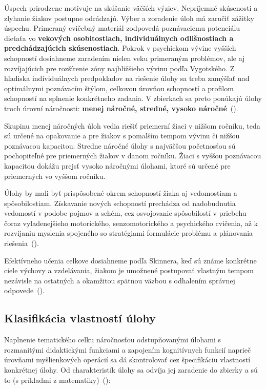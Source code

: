 Úspech prirodzene motivuje na skúšanie väčších výziev. Nepríjemné skúsenosti a zlyhanie žiakov postupne odrádzajú. Výber a zoradenie úloh má zaručiť zážitky úspechu. Primeraný cvičebný materiál zodpovedá poznávaciemu potenciálu dieťaťa vo \textbf{vekových osobitostiach, individuálnych odlišnostiach a predchádzajúcich skúsenostiach}. Pokrok v psychickom vývine vyšších schopností dosiahneme zaradením nielen veku primeraným problémov, ale aj rozvíjajúcich pre rozšírenie zóny najbližšieho vývinu podľa Vygotského. Z hľadiska individuálnych predpokladov na riešenie úlohy sa treba zamýšľať nad optimálnymi poznávacím štýlom, celkovou úrovňou schopností a profilom schopností na splnenie konkrétneho zadania. V zbierkach sa preto ponúkajú úlohy troch úrovní náročnosti: \textbf{menej náročné, stredné, vysoko náročné}~(\cite{pavlovkin_ziak_1989}).
 
Skupinu menej náročných úloh vedia riešiť priemerní žiaci v nižšom ročníku, teda sú určené na opakovanie a pre žiakov s pomalším tempom vývinu či nižšou poznávacou kapacitou. Stredne náročné úlohy s najväčšou početnosťou sú pochopiteľné pre priemerných žiakov v danom ročníku. Žiaci s vyššou poznávacou kapacitou dokážu prejsť vysoko náročnými úlohami, ktoré sú určené pre priemerných vo vyššom ročníku.
 
Úlohy by mali byť prispôsobené okrem schopností žiaka aj vedomostiam a spôsobilostiam. Získavanie nových schopností prechádza od nadobudnutia vedomostí v podobe pojmov a schém, cez osvojovanie spôsobilostí v priebehu čoraz vyladenejšieho motorického, senzomotorického a psychického cvičenia, až k rozvíjaniu myslenia spojeného so stratégiami formulácie problému a plánovania riešenia~(\cite{pavlovkin_ziak_1989}).

Efektívneho učenia celkove dosiahneme podľa Skinnera, keď sú známe konkrétne ciele výchovy a vzdelávania, žiakom je umožnené postupovať vlastným tempom nezávisle na ostatných a okamžitou spätnou väzbou s odhalením správnej odpovede~(\cite{pavlovkin_ziak_1989}).


\subsection{Klasifikácia vlastností úlohy} \label{sec:klasifikacia-ulohy}
Naplnenie tematického celku náročnosťou odstupňovanými úlohami s rozmanitými didaktickými funkciami a zapojením kognitívnych funkcií naprieč úrovňami myšlienkových operácií sa dá skontrolovať cez špecifikáciu vlastností konkrétnej úlohy. Od charakteristík úlohy sa odvíja  jej zaradenie do zbierky a sú to (s príkladmi z matematiky)~(\cite{mindakova_tvorba_2008}):

